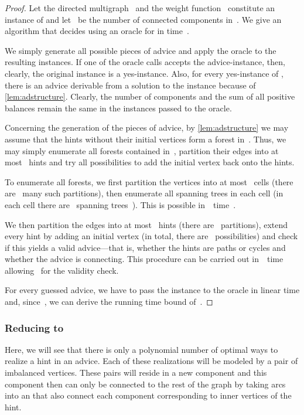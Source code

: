 \begin{proof}
  Let the directed multigraph~ and the weight function~ constitute an instance of \pWMEEs{} and let~ be the number of connected components in~. We give an algorithm that decides \pWMEEs{} using an oracle for \pWMEECAs{} in time~.

We simply generate all possible pieces of advice and apply the oracle to the resulting instances. If one of the oracle calls accepts the advice-instance, then, clearly, the original instance is a yes-instance. Also, for every yes-instance of \pWMEEs{}, there is an advice derivable from a solution to the instance because of \autoref{lem:adstructure}. Clearly, the number of components and the sum of all positive balances remain the same in the instances passed to the oracle.

Concerning the generation of the pieces of advice, by \autoref{lem:adstructure} we may assume that the hints without their initial vertices form a forest in~. Thus, we may simply enumerate all forests contained in~, partition their edges into at most~ hints and try all possibilities to add the initial vertex back onto the hints.

To enumerate all forests, we first partition the vertices into at most~ cells (there are~ many such partitions), then enumerate all spanning trees in each cell (in each cell there are~ spanning trees~\cite{Cay89}). This is possible in~~time~\cite{KR95}. 

We then partition the edges into at most~ hints (there are~ partitions), extend every hint by adding an initial vertex (in total, there are~ possibilities) and check if this yields a valid advice---that is, whether the hints are paths or cycles and whether the advice is connecting. This procedure can be carried out in~~time allowing~ for the validity check.

For every guessed advice, we have to pass the instance to the oracle in linear time and, since~, we can derive the running time bound of~.
\end{proof}




\subsubsection{Reducing \pWMEEAs{} to \pWMEEs{}} Here, we will see that there is only a polynomial number of optimal ways to realize a hint in an advice. Each of these realizations will be modeled by a pair of imbalanced vertices. These pairs will reside in a new component and this component then can only be connected to the rest of the graph by taking arcs into an \EE{} that also connect each component corresponding to inner vertices of the hint. 


